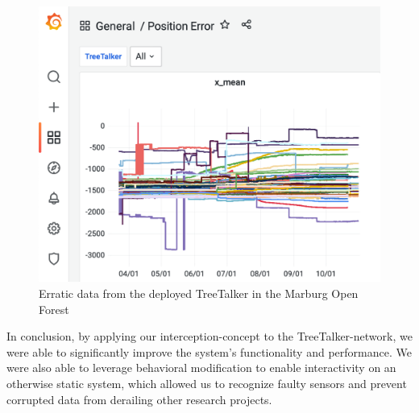 \begin{figure}
    \centering
    \includegraphics[width=\linewidth]{figures/TTT_position_data_smallest.png}
    \caption{Erratic data from the deployed TreeTalker in the Marburg Open Forest}
    \label{fig:ttt_position_error}
\end{figure}

In conclusion, by applying our interception-concept to the TreeTalker-network, we were able to significantly improve the system's functionality and performance.
We were also able to leverage behavioral modification to enable interactivity on an otherwise static system, which allowed us to recognize faulty sensors and prevent corrupted data from derailing other research projects.
